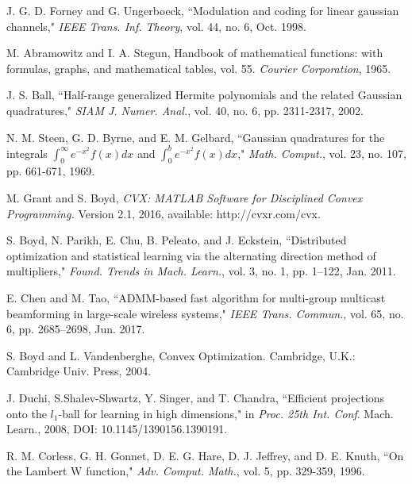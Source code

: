 \documentclass[journal]{IEEEtran}
\begin{document}
\begin{thebibliography}{1}	
J. G. D. Forney and G. Ungerboeck, ``Modulation and coding for linear gaussian channels," \emph{IEEE Trans. Inf. Theory}, vol. 44, no. 6, Oct. 1998.

M. Abramowitz and I. A. Stegun, Handbook of mathematical functions: with formulas, graphs, and mathematical tables, vol. 55. \emph{Courier Corporation}, 1965.

J. S. Ball, ``Half-range generalized Hermite polynomials and the related Gaussian quadratures," \emph{SIAM J. Numer. Anal.}, vol. 40, no. 6, pp. 2311-2317, 2002.

N. M. Steen, G. D. Byrne, and E. M. Gelbard, ``Gaussian quadratures for the integrals $\int_{0}^{\infty} e^{-x^2}f\left(x\right) dx$ and $\int_{0}^{b}e^{-x^2}f\left(x\right)dx$," \emph{ Math. Comput.}, vol. 23, no. 107, pp. 661-671, 1969.

M. Grant and S. Boyd, \emph{CVX: MATLAB Software for Disciplined Convex Programming.} Version 2.1, 2016, available: http://cvxr.com/cvx.

S. Boyd, N. Parikh, E. Chu, B. Peleato, and J. Eckstein, ``Distributed optimization and statistical learning via the alternating direction method of multipliers," \emph{Found. Trends in Mach. Learn.}, vol. 3, no. 1, pp. 1–122, Jan. 2011.

E. Chen and M. Tao, ``ADMM-based fast algorithm for multi-group multicast beamforming in large-scale wireless systems," \emph{IEEE Trans. Commun.}, vol. 65, no. 6, pp. 2685–2698, Jun. 2017.

S. Boyd and L. Vandenberghe, Convex Optimization. Cambridge, U.K.: Cambridge Univ. Press, 2004.

J. Duchi, S.Shalev-Shwartz, Y. Singer, and
T. Chandra, ``Efficient projections onto
the $l_1$-ball for learning in high dimensions," in \emph{Proc. 25th Int. Conf}. Mach. Learn., 2008,
DOI: 10.1145/1390156.1390191.

R. M. Corless, G. H. Gonnet, D. E. G. Hare, D. J. Jeffrey, and D. E.
Knuth, ``On the Lambert W function," \emph{Adv. Comput. Math.}, vol. 5, pp. 329-359, 1996.
\end{thebibliography}
\end{document}
